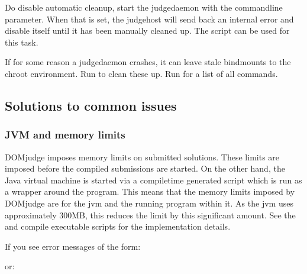 \documentclass[a4paper,10pt,english,openany]{sphinxmanual}
\begin{document}
\sphinxAtStartPar
Do disable automatic cleanup, start the judgedaemon with the
 commandline parameter. When that is set, the
judgehost will send back an internal error and disable itself until
it has been manually cleaned up. The script 
can be used for this task.

\sphinxAtStartPar
If for some reason a judgedaemon crashes, it can leave stale
bind\sphinxhyphen{}mounts to the chroot environment. Run
 to clean these up. Run
 for a list of all
commands.


\subsection{Solutions to common issues}
\label{\detokenize{judging:solutions-to-common-issues}}

\subsubsection{JVM and memory limits}
\label{\detokenize{judging:jvm-and-memory-limits}}
\sphinxAtStartPar
DOMjudge imposes memory limits on submitted solutions. These limits
are imposed before the compiled submissions are started. On the other
hand, the Java virtual machine is started via a compile\sphinxhyphen{}time generated
script which is run as a wrapper around the program. This means that
the memory limits imposed by DOMjudge are for the jvm and the running
program within it. As the jvm uses approximately 300MB, this reduces
the limit by this significant amount. See the  and
 compile executable scripts for the
implementation details.

\sphinxAtStartPar
If you see error messages of the form:

\begin{sphinxVerbatim}[commandchars=\\\{\}]
     
      
\end{sphinxVerbatim}

\sphinxAtStartPar
or:
\end{document}
